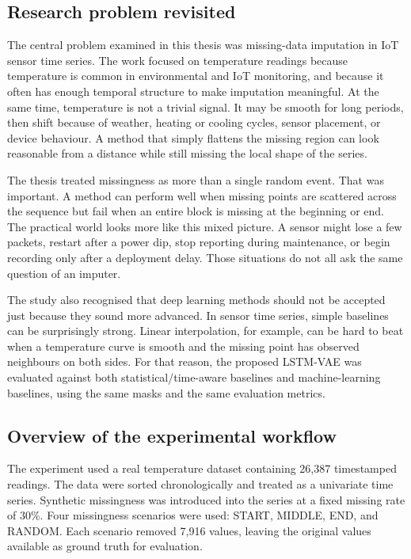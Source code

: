\subsection{Research problem revisited}

The central problem examined in this thesis was missing-data imputation in IoT sensor time series. The work focused on temperature readings because temperature is common in environmental and IoT monitoring, and because it often has enough temporal structure to make imputation meaningful. At the same time, temperature is not a trivial signal. It may be smooth for long periods, then shift because of weather, heating or cooling cycles, sensor placement, or device behaviour. A method that simply flattens the missing region can look reasonable from a distance while still missing the local shape of the series.

The thesis treated missingness as more than a single random event. That was important. A method can perform well when missing points are scattered across the sequence but fail when an entire block is missing at the beginning or end. The practical world looks more like this mixed picture. A sensor might lose a few packets, restart after a power dip, stop reporting during maintenance, or begin recording only after a deployment delay. Those situations do not all ask the same question of an imputer.

The study also recognised that deep learning methods should not be accepted just because they sound more advanced. In sensor time series, simple baselines can be surprisingly strong. Linear interpolation, for example, can be hard to beat when a temperature curve is smooth and the missing point has observed neighbours on both sides. For that reason, the proposed LSTM-VAE was evaluated against both statistical/time-aware baselines and machine-learning baselines, using the same masks and the same evaluation metrics.

\subsection{Overview of the experimental workflow}

The experiment used a real temperature dataset containing 26,387 timestamped readings. The data were sorted chronologically and treated as a univariate time series. Synthetic missingness was introduced into the series at a fixed missing rate of 30\%. Four missingness scenarios were used: START, MIDDLE, END, and RANDOM. Each scenario removed 7,916 values, leaving the original values available as ground truth for evaluation.

